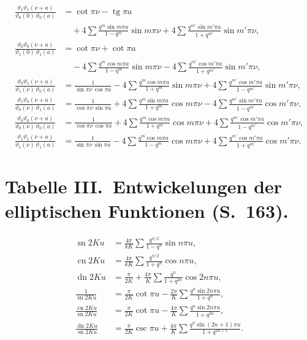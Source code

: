 \documentclass[12pt,a4paper]{article}
\DeclareMathOperator{\tg}{tg}
\DeclareMathOperator{\sn}{sn}
\DeclareMathOperator{\cn}{cn}
\DeclareMathOperator{\dn}{dn}
\begin{document}
\begin{align*}
\frac{\vartheta_1\vartheta_1(\nu+a)}{\vartheta_0(0)\,\vartheta_0(a)} &= \cot\pi\nu - \tg\pi a \\
&\quad + 4\sum \frac{q^m \sin m\pi a}{1-q^m} \sin m\pi\nu + 4\sum \frac{q^{m'} \sin m'\pi a}{1+q^{m'}} \sin m'\pi\nu,\\
\frac{\vartheta_0\vartheta_0(\nu+a)}{\vartheta_1(0)\,\vartheta_1(a)} &= \cot\pi\nu + \cot\pi a \\
&\quad - 4\sum \frac{q^m \cos m\pi a}{1-q^m} \sin m\pi\nu - 4\sum \frac{q^{m'} \cos m'\pi a}{1+q^{m'}} \sin m'\pi\nu,\\
\frac{\vartheta_0\vartheta_1(\nu+a)}{\vartheta_1(\nu)\,\vartheta_0(a)} &= \frac{1}{\sin\pi\nu\,\cos\pi a} - 4\sum \frac{q^m \cos m\pi a}{1+q^m} \sin m\pi\nu + 4\sum \frac{q^{m'} \cos m'\pi a}{1-q^{m'}} \sin m'\pi\nu,\\
\frac{\vartheta_1\vartheta_0(\nu+a)}{\vartheta_0(\nu)\,\vartheta_1(a)} &= \frac{1}{\cos\pi\nu\,\sin\pi a} + 4\sum \frac{q^m \sin m\pi a}{1+q^m} \cos m\pi\nu - 4\sum \frac{q^{m'} \sin m'\pi a}{1-q^{m'}} \cos m'\pi\nu,\\
\frac{\vartheta_0\vartheta_0(\nu+a)}{\vartheta_0(\nu)\,\vartheta_0(a)} &= \frac{1}{\cos\pi\nu\,\cos\pi a} + 4\sum \frac{q^m \cos m\pi a}{1+q^m} \cos m\pi\nu + 4\sum \frac{q^{m'} \cos m'\pi a}{1-q^{m'}} \cos m'\pi\nu,\\
\frac{\vartheta_1\vartheta_1(\nu+a)}{\vartheta_1(\nu)\,\vartheta_1(a)} &= \frac{1}{\sin\pi\nu\,\sin\pi a} - 4\sum \frac{q^m \cos m\pi a}{1-q^m} \cos m\pi\nu + 4\sum \frac{q^{m'} \cos m'\pi a}{1+q^{m'}} \cos m'\pi\nu.
\end{align*}

\newpage
\section*{Tabelle III.\ Entwickelungen der elliptischen Funktionen (S.~163).}

\begin{align*}
\sn 2Ku &= \frac{4\pi}{kK} \sum \frac{q^{n/2}}{1-q^n} \sin n\pi u,\\
\cn 2Ku &= \frac{4\pi}{kK} \sum \frac{q^{n/2}}{1+q^n} \cos n\pi u,\\
\dn 2Ku &= \frac{\pi}{2K} + \frac{4\pi}{K} \sum \frac{q^n}{1+q^{2n}} \cos 2n\pi u,\\
\frac{1}{\sn 2Ku} &= \frac{\pi}{2K} \cot\pi u - \frac{2\pi}{K} \sum \frac{q^n \sin 2n\pi u}{1+q^n},\\
\frac{\cn 2Ku}{\sn 2Ku} &= \frac{\pi}{2K} \cot\pi u - \frac{4\pi}{K} \sum \frac{q^n \sin 2n\pi u}{1+q^{2n}},\\
\frac{\dn 2Ku}{\sn 2Ku} &= \frac{\pi}{2K} \csc\pi u + \frac{4\pi}{K} \sum \frac{q^n \sin(2n+1)\pi u}{1+q^{2n+1}}.
\end{align*}
\end{document}
